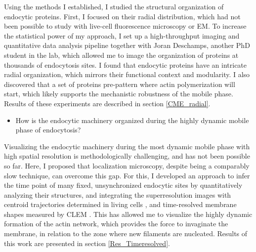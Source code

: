 Using the methods I established, I studied the structural organization of endocytic proteins. First, I focused on their radial distribution, which had not been possible to study with live-cell fluorescence microscopy or EM. To increase the statistical power of my approach, I set up a high-throughput imaging and quantitative data analysis pipeline together with Joran Deschamps, another PhD student in the lab, which allowed me to image the organization of proteins at thousands of endocytosis sites. I found that endocytic proteins have an intricate radial organization, which mirrors their functional context and modularity. I also discovered that a set of proteins pre-pattern where actin polymerization will start, which likely supports the mechanistic robustness of the mobile phase. Results of these experiments are described in section \ref{CME_radial}.

\begin{itemize}
	\item How is the endocytic machinery organized during the highly dynamic mobile phase of endocytosis?
\end{itemize}

Visualizing the endocytic machinery during the most dynamic mobile phase with high spatial resolution is methodologically challenging, and has not been possible so far. Here, I proposed that localization microscopy, despite being a comparably slow technique, can overcome this gap. For this, I developed an approach to infer the time point of many fixed, unsynchronized endocytic sites by quantitatively analyzing their structures, and integrating the superresolution images with centroid trajectories determined in living cells \citep{Picco:2015iv}, and time-resolved membrane shapes measured by CLEM \citep{Kukulski:2012jl}. This has allowed me to visualize the highly dynamic formation of the actin network, which provides the force to invaginate the membrane, in relation to the zone where new filaments are nucleated. Results of this work are presented in section \ref{Res_Timeresolved}.
